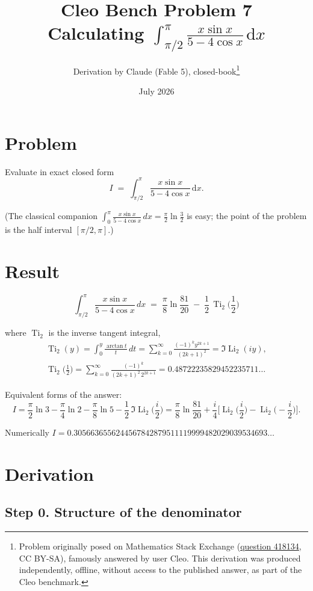 \documentclass[11pt]{article}
\title{Cleo Bench Problem 7\\[1ex]\large Calculating $\int_{\pi/2}^{\pi}\frac{x\sin{x}}{5-4\cos{x}}\,\mathrm dx$}
\author{Derivation by Claude (Fable 5), closed-book\thanks{Problem originally
posed on Mathematics Stack Exchange
(\href{https://math.stackexchange.com/q/418134}{question 418134}, CC BY-SA),
famously answered by user Cleo. This derivation was produced independently,
offline, without access to the published answer, as part of the Cleo benchmark.}}
\date{July 2026}
\theoremstyle{remark}
\begin{document}
\maketitle

\section*{Problem}

Evaluate in exact closed form
\[I \;=\; \int_{\pi/2}^{\pi}\frac{x\sin x}{5-4\cos x}\,\mathrm dx .\]

(The classical companion $\int_{0}^{\pi}\frac{x\sin x}{5-4\cos x}\,dx=\frac{\pi}{2}\ln\frac32$ is easy; the point of the problem is the half interval $[\pi/2,\pi]$.)

\section*{Result}

\[\boxed{\;\int_{\pi/2}^{\pi}\frac{x\sin x}{5-4\cos x}\,dx
\;=\;\frac{\pi}{8}\ln\frac{81}{20}\;-\;\frac12\,\operatorname{Ti}_2\!\Big(\frac12\Big)\;}\]

where $\operatorname{Ti}_2$ is the inverse tangent integral,
\[\begin{gathered}
\operatorname{Ti}_2(y)=\int_0^y\frac{\arctan t}{t}\,dt=\sum_{k=0}^{\infty}\frac{(-1)^k y^{2k+1}}{(2k+1)^2}=\Im\operatorname{Li}_2(iy),\\
\operatorname{Ti}_2\Big(\frac12\Big)=\sum_{k=0}^{\infty}\frac{(-1)^k}{(2k+1)^2\,2^{2k+1}}=0.48722235829452235711\ldots
\end{gathered}\]

Equivalent forms of the answer:
\[I=\frac{\pi}{2}\ln 3-\frac{\pi}{4}\ln 2-\frac{\pi}{8}\ln 5-\frac12\,\Im\operatorname{Li}_2\!\Big(\frac{i}{2}\Big)
=\frac{\pi}{8}\ln\frac{81}{20}+\frac{i}{4}\Big[\operatorname{Li}_2\Big(\frac i2\Big)-\operatorname{Li}_2\Big(-\frac i2\Big)\Big].\]

Numerically $I = 0.3056636556244567842879511119999482029039534693\ldots$

\section*{Derivation}

\subsection*{Step 0. Structure of the denominator}
\end{document}
